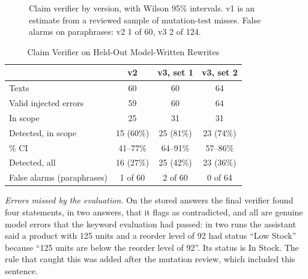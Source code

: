 \documentclass[conference]{IEEEtran}
\begin{document}
\begin{figure}[t]
\centering
{}
\caption{Claim verifier by version, with Wilson 95\% intervals. v1 is an estimate from a reviewed sample of mutation-test misses. False alarms on paraphrases:
v2 1 of 60, v3 2 of 124.}
\label{fig:versions}
\end{figure}

\begin{table}[t]
\caption{Claim Verifier on Held-Out Model-Written Rewrites}
\label{tab:claimtest}
\centering
\footnotesize
\setlength{\tabcolsep}{4pt}
\begin{tabular}{@{}lccc@{}}
\toprule
 & v2 & v3, set 1 & v3, set 2 \\
\midrule
Texts & 60 & 60 & 64 \\
Valid injected errors & 59 & 60 & 64 \\
In scope & 25 & 31 & 31 \\
Detected, in scope & 15 (60\%) & 25 (81\%) & 23 (74\%) \\
\quad 95\% CI & 41--77\% & 64--91\% & 57--86\% \\
Detected, all & 16 (27\%) & 25 (42\%) & 23 (36\%) \\
False alarms (paraphrases) & 1 of 60 & 2 of 60 & 0 of 64 \\
\bottomrule
\end{tabular}
\end{table}

\textit{Errors missed by the evaluation.} On the stored answers the final verifier found four statements,
in two answers, that it flags as contradicted, and all are genuine model errors that the keyword evaluation had passed: in two runs the
assistant said a product with 125 units and a reorder level of 92 had status ``Low Stock'' because ``125
units are below the reorder level of 92''. Its status is In Stock. The rule that caught this was added after
the mutation review, which included this sentence.
\end{document}
